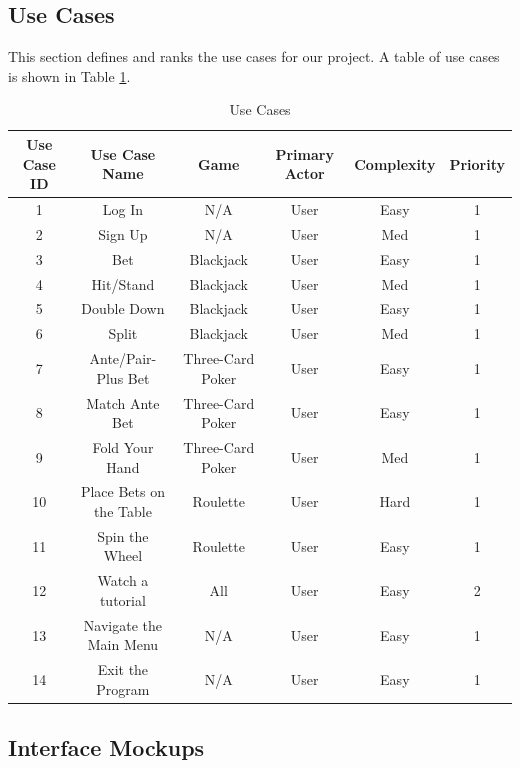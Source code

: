 \documentclass[10pt,conference,onecolumn,compsoc]{IEEEtran}
\begin{document}
\subsection{Use Cases}
This section defines and ranks the use cases for our project. A table of use cases is shown in Table \ref{tab:useCaseIndex}.

\begin{table}
\centering
\begin{tabular}{|c|c|c|c|c|c|}
\hline
Use Case ID & Use Case Name & Game & Primary Actor & Complexity & Priority \\
\hline \hline
1 & Log In & N/A & User & Easy & 1\\
\hline
2 & Sign Up & N/A & User & Med & 1\\
\hline
3 & Bet & Blackjack & User & Easy & 1\\
\hline
4 & Hit/Stand & Blackjack & User & Med & 1\\
\hline
5 & Double Down & Blackjack & User & Easy & 1\\
\hline
6 & Split & Blackjack & User & Med & 1\\
\hline
7 & Ante/Pair-Plus Bet & Three-Card Poker & User & Easy & 1\\
\hline
8 & Match Ante Bet & Three-Card Poker & User & Easy & 1\\
\hline
9 & Fold Your Hand & Three-Card Poker & User & Med & 1\\
\hline
10 & Place Bets on the Table & Roulette & User & Hard & 1\\
\hline
11 & Spin the Wheel & Roulette & User & Easy & 1\\
\hline
12 & Watch a tutorial & All & User & Easy & 2\\
\hline
13 & Navigate the Main Menu & N/A & User & Easy & 1\\
\hline
14 & Exit the Program & N/A & User & Easy & 1\\
\hline
\end{tabular}
\caption{Use Cases}
\label{tab:useCaseIndex}
\end{table}


\subsection{Interface Mockups}
\end{document}

